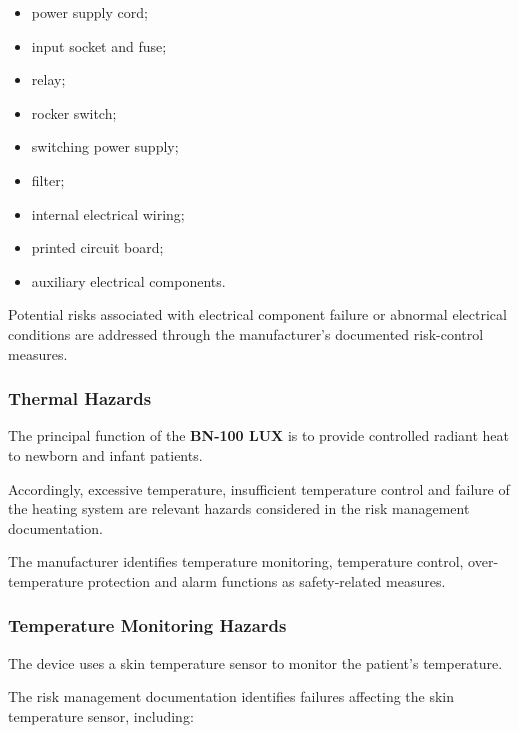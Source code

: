 \begin{itemize}

    \item power supply cord;

    \item input socket and fuse;

    \item relay;

    \item rocker switch;

    \item switching power supply;

    \item filter;

    \item internal electrical wiring;

    \item printed circuit board;

    \item auxiliary electrical components.

\end{itemize}

Potential risks associated with electrical component failure or abnormal
electrical conditions are addressed through the manufacturer's documented
risk-control measures.

\subsubsection{Thermal Hazards}

The principal function of the \textbf{BN-100 LUX} is to provide controlled
radiant heat to newborn and infant patients.

Accordingly, excessive temperature, insufficient temperature control and
failure of the heating system are relevant hazards considered in the risk
management documentation.

The manufacturer identifies temperature monitoring, temperature control,
over-temperature protection and alarm functions as safety-related measures.

\subsubsection{Temperature Monitoring Hazards}

The device uses a skin temperature sensor to monitor the patient's
temperature.

The risk management documentation identifies failures affecting the skin
temperature sensor, including:


